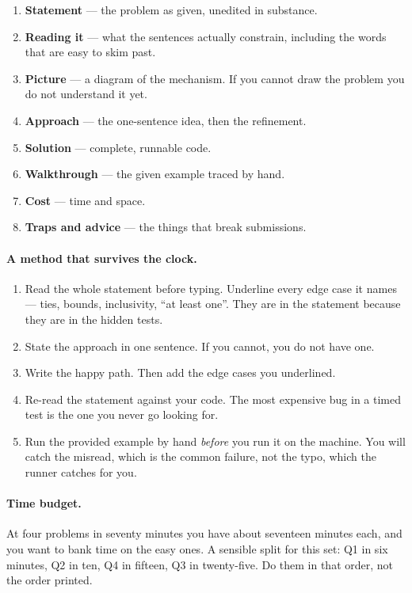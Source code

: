 \documentclass[11pt,a4paper]{article}
\begin{document}
\begin{enumerate}
  \item \textbf{Statement} --- the problem as given, unedited in substance.
  \item \textbf{Reading it} --- what the sentences actually constrain, including
        the words that are easy to skim past.
  \item \textbf{Picture} --- a diagram of the mechanism. If you cannot draw the
        problem you do not understand it yet.
  \item \textbf{Approach} --- the one-sentence idea, then the refinement.
  \item \textbf{Solution} --- complete, runnable code.
  \item \textbf{Walkthrough} --- the given example traced by hand.
  \item \textbf{Cost} --- time and space.
  \item \textbf{Traps and advice} --- the things that break submissions.
\end{enumerate}

\paragraph{A method that survives the clock.}
\begin{enumerate}
  \item Read the whole statement before typing. Underline every edge case it
        names --- ties, bounds, inclusivity, ``at least one''. They are in the
        statement because they are in the hidden tests.
  \item State the approach in one sentence. If you cannot, you do not have one.
  \item Write the happy path. Then add the edge cases you underlined.
  \item Re-read the statement against your code. The most expensive bug in a
        timed test is the one you never go looking for.
  \item Run the provided example by hand \emph{before} you run it on the
        machine. You will catch the misread, which is the common failure, not
        the typo, which the runner catches for you.
\end{enumerate}

\paragraph{Time budget.} At four problems in seventy minutes you have about
seventeen minutes each, and you want to bank time on the easy ones. A sensible
split for this set: Q1 in six minutes, Q2 in ten, Q4 in fifteen, Q3 in
twenty-five. Do them in that order, not the order printed.
\end{document}
